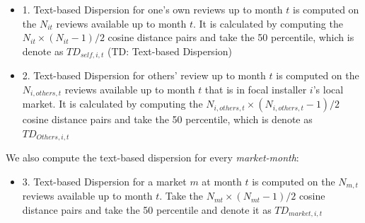 \documentclass[msom,blindrev]{informs3}
\begin{document}
\begin{itemize}
\item 1. Text-based Dispersion for one's own reviews up to month $t$ is computed on the $N_{it}$ reviews available up to month $t$. It is calculated by computing the $N_{it}\times (N_{it}-1)/2$ cosine distance pairs and take the 50 percentile, which is denote as $TD_{self,i,t}$ (TD: Text-based Dispersion)\\
\item 2. Text-based Dispersion for others' review up to month $t$ is computed on the $N_{i,others,t}$ reviews available up to month $t$ that is in focal installer $i$'s local market. It is calculated by computing the $N_{i,others,t}\times (N_{i,others,t}-1)/2$ cosine distance pairs and take the 50 percentile, which is denote as $TD_{Others,i,t}$ \\
\end{itemize}
We also compute the text-based dispersion for every \textit{market-month}: \\

\begin{itemize}
\item 3. Text-based Dispersion for a market $m$ at month $t$ is computed on the $N_{m,t}$ reviews available up to month $t$. Take the  $N_{mt}\times (N_{mt}-1)/2$ cosine distance pairs and take the 50 percentile and denote it as $TD_{market,i,t}$ \\
\end{itemize}
\end{document}
